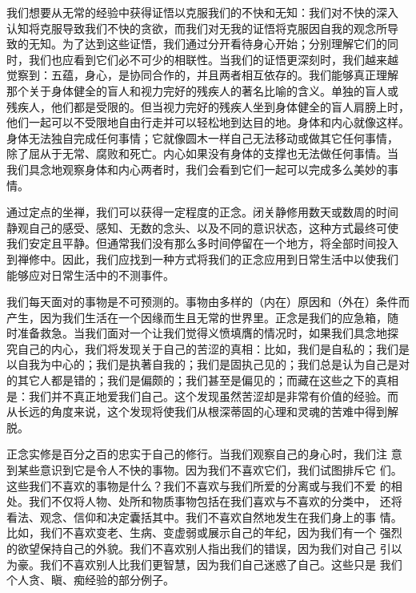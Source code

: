 我们想要从无常的经验中获得证悟以克服我们的不快和无知：我们对不快的深入
认知将克服导致我们不快的贪欲，而我们对无我的证悟将克服因自我的观念所导
致的无知。为了达到这些证悟，我们通过分开看待身心开始；分别理解它们的同
时，我们也应看到它们必不可少的相联性。当我们的证悟更深刻时，我们越来越
觉察到：五蕴，身心，是协同合作的，并且\1两者相互依存的。我们能够真正理解
那个关于身体健全的盲人和视力完好的残疾人的著名比喻的含义。单独的盲人或
残疾人，他们都是受限的。但当视力完好的残疾人坐到身体健全的盲人肩膀上时，
他们一起可以不受限地自由行走并可以轻松地到达目的地。身体和内心就像这样。
身体无法独自完成任何事情；它就像圆木一样自己无法移动或做其它任何事情，
除了屈从于无常、腐败和死亡。内心如果没有身体的支撑也无法做任何事情。当
我们具念地观察身体和内心两者时，我们会看到它们一起可以完成多么美妙的事
情。

通过定点的坐禅，我们可以获得一定程度的正念。闭关静修用数天或数周的时间
静观自己的感受、感知、无数的念头、以及不同的意识状态，这种方式最终可使
我们安定且平静。但通常我们没有那么多时间停留在一个地方，将全部时间投入
到禅修中。因此，我们应找到一种方式将我们的正念应用到日常生活中以使我们
能够应对日常生活中的不测事件。

我们每天面对的事物是不可预测的。事物由多样的（内在）原因和（外在）条件而
产生，因为我们生活在一个因缘而生且无常的世界里。正念是我们的应急箱，随
时准备救急。当我们面对一个让我们觉得义愤填膺的情况时，如果我们具念地探
究自己的内心，我们将发现关于自己的苦涩的真相：比如，我们是自私的；我们是
以自我为中心的；我们是执著自我的；我们是固执己见的；我们总是认为自己是对
的其它人都是错的；我们是偏颇的；我们甚至是偏见的；而藏在这些之下的真相
是：我们并不真正地爱我们自己。这个发现虽然苦涩却是非常有价值的经验。而
从长远的角度来说，这个发现将使我们从根深蒂固的心理和灵魂的苦难中得到解
脱。

\1正念实修是百分之百的忠实于自己的修行。当我们观察自己的身心时，我们注
意到某些意识到它是令人不快的事物。因为我们不喜欢它们，我们试图排斥它
们。这些我们不喜欢的事物是什么？我们不喜欢与我们所爱的分离或与我们不爱
的相处。我们不仅将人物、处所和物质事物包括在我们喜欢与不喜欢的分类中，
还将看法、观念、信仰和决定囊括其中。我们不喜欢自然地发生在我们身上的事
情。比如，我们不喜欢变老、生病、变虚弱或展示自己的年纪，因为我们有一个
强烈的欲望保持自己的外貌。我们不喜欢别人指出我们的错误，因为我们对自己
引以为豪。我们不喜欢别人比我们更智慧，因为我们自己迷惑了自己。这些只是
我们个人贪、瞋、痴经验的部分例子。

\endchapter

\byebye
